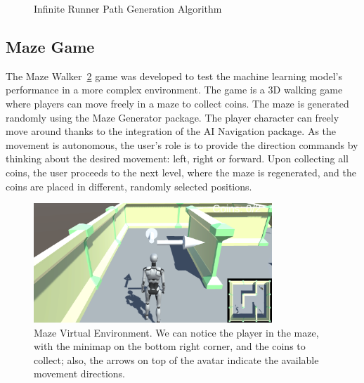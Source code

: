 \begin{figure}[!htbp]
{
    }
    \caption{Infinite Runner Path Generation Algorithm}\label{fig:infinite_runner_path_generation}
\end{figure}

\subsection*{Maze Game}
The Maze Walker~\ref{fig:maze} game was developed to test the machine learning model's performance in a more complex environment.
The game is a 3D walking game where players can move freely in a maze to collect coins.
The maze is generated randomly using the Maze Generator package.
The player character can freely move around thanks to the integration of the AI Navigation package.
As the movement is autonomous, the user's role is to provide the direction commands by thinking about the desired movement: left, right or forward.
Upon collecting all coins, the user proceeds to the next level, where the maze is regenerated, and the coins are placed in different, randomly selected positions.

\begin{figure}[!htbp]
    \centering
    \includegraphics[width=0.8\textwidth]{Figures/Methodology/maze}
    \caption{Maze Virtual Environment. We can notice the player in the maze, with the minimap on the bottom right corner, and the coins to collect; also, the arrows on top of the avatar indicate the available movement directions.}\label{fig:maze}
\end{figure}